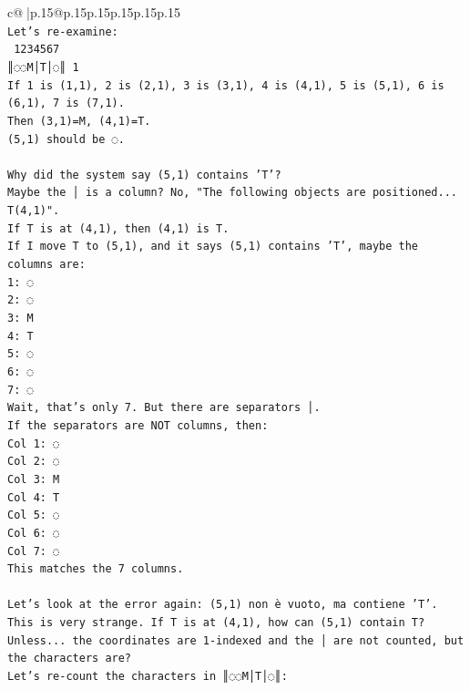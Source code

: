\documentclass{article}
\begin{document}
{\begin{supertabular}{c@{$\;$}|p{.15\linewidth}@{}p{.15\linewidth}p{.15\linewidth}p{.15\linewidth}p{.15\linewidth}p{.15\linewidth}}
{{{\\ 
\texttt{Let's re{-}examine:} \\
\texttt{ 1234567} \\
\texttt{║◌◌M│T│◌║ 1} \\
\texttt{If 1 is (1,1), 2 is (2,1), 3 is (3,1), 4 is (4,1), 5 is (5,1), 6 is (6,1), 7 is (7,1).} \\
\texttt{Then (3,1)=M, (4,1)=T.} \\
\texttt{(5,1) should be ◌.} \\
\\ 
\texttt{Why did the system say (5,1) contains 'T'?} \\
\texttt{Maybe the │ is a column? No, "The following objects are positioned... T(4,1)".} \\
\texttt{If T is at (4,1), then (4,1) is T.} \\
\texttt{If I move T to (5,1), and it says (5,1) contains 'T', maybe the columns are:} \\
\texttt{1: ◌} \\
\texttt{2: ◌} \\
\texttt{3: M} \\
\texttt{4: T} \\
\texttt{5: ◌} \\
\texttt{6: ◌} \\
\texttt{7: ◌} \\
\texttt{Wait, that's only 7. But there are separators │.} \\
\texttt{If the separators are NOT columns, then:} \\
\texttt{Col 1: ◌} \\
\texttt{Col 2: ◌} \\
\texttt{Col 3: M} \\
\texttt{Col 4: T} \\
\texttt{Col 5: ◌} \\
\texttt{Col 6: ◌} \\
\texttt{Col 7: ◌} \\
\texttt{This matches the 7 columns.} \\
\\ 
\texttt{Let's look at the error again: (5,1) non è vuoto, ma contiene 'T'.} \\
\texttt{This is very strange. If T is at (4,1), how can (5,1) contain T?} \\
\texttt{Unless... the coordinates are 1{-}indexed and the │ are not counted, but the characters are?} \\
\texttt{Let's re{-}count the characters in ║◌◌M│T│◌║:} \\
}}}
\end{supertabular}}
\end{document}
